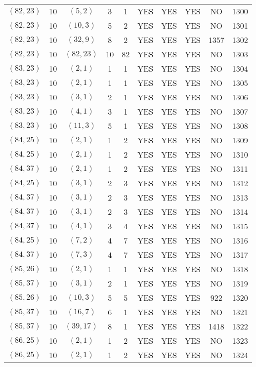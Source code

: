 \begin{longtable}{|c|c|c|c|c|c|c|c|c|c|}
$(82, 23)$ & 10 & $(5, 2)$ & 3 & 1 & YES & YES & YES & NO & 1300\\
$(82, 23)$ & 10 & $(10, 3)$ & 5 & 2 & YES & YES & YES & NO & 1301\\
$(82, 23)$ & 10 & $(32, 9)$ & 8 & 2 & YES & YES & YES & 1357 & 1302\\
$(82, 23)$ & 10 & $(82, 23)$ & 10 & 82 & YES & YES & YES & NO & 1303\\
$(83, 23)$ & 10 & $(2, 1)$ & 1 & 1 & YES & YES & YES & NO & 1304\\
$(83, 23)$ & 10 & $(2, 1)$ & 1 & 1 & YES & YES & YES & NO & 1305\\
$(83, 23)$ & 10 & $(3, 1)$ & 2 & 1 & YES & YES & YES & NO & 1306\\
$(83, 23)$ & 10 & $(4, 1)$ & 3 & 1 & YES & YES & YES & NO & 1307\\
$(83, 23)$ & 10 & $(11, 3)$ & 5 & 1 & YES & YES & YES & NO & 1308\\
$(84, 25)$ & 10 & $(2, 1)$ & 1 & 2 & YES & YES & YES & NO & 1309\\
$(84, 25)$ & 10 & $(2, 1)$ & 1 & 2 & YES & YES & YES & NO & 1310\\
$(84, 37)$ & 10 & $(2, 1)$ & 1 & 2 & YES & YES & YES & NO & 1311\\
$(84, 25)$ & 10 & $(3, 1)$ & 2 & 3 & YES & YES & YES & NO & 1312\\
$(84, 37)$ & 10 & $(3, 1)$ & 2 & 3 & YES & YES & YES & NO & 1313\\
$(84, 37)$ & 10 & $(3, 1)$ & 2 & 3 & YES & YES & YES & NO & 1314\\
$(84, 37)$ & 10 & $(4, 1)$ & 3 & 4 & YES & YES & YES & NO & 1315\\
$(84, 25)$ & 10 & $(7, 2)$ & 4 & 7 & YES & YES & YES & NO & 1316\\
$(84, 37)$ & 10 & $(7, 3)$ & 4 & 7 & YES & YES & YES & NO & 1317\\
$(85, 26)$ & 10 & $(2, 1)$ & 1 & 1 & YES & YES & YES & NO & 1318\\
$(85, 37)$ & 10 & $(3, 1)$ & 2 & 1 & YES & YES & YES & NO & 1319\\
$(85, 26)$ & 10 & $(10, 3)$ & 5 & 5 & YES & YES & YES & 922 & 1320\\
$(85, 37)$ & 10 & $(16, 7)$ & 6 & 1 & YES & YES & YES & NO & 1321\\
$(85, 37)$ & 10 & $(39, 17)$ & 8 & 1 & YES & YES & YES & 1418 & 1322\\
$(86, 25)$ & 10 & $(2, 1)$ & 1 & 2 & YES & YES & YES & NO & 1323\\
$(86, 25)$ & 10 & $(2, 1)$ & 1 & 2 & YES & YES & YES & NO & 1324\\

\end{longtable}
